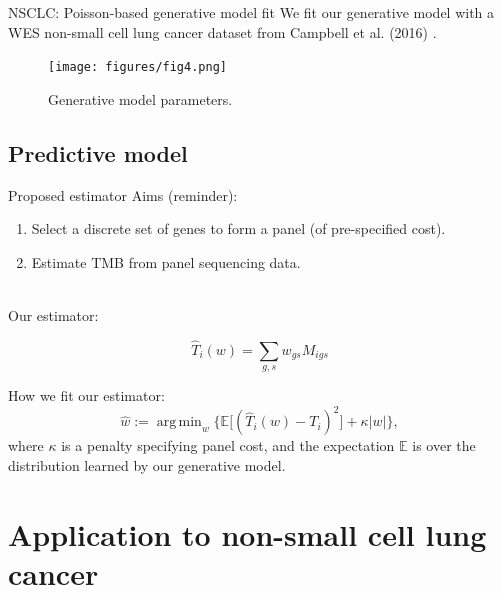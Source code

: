 \documentclass{beamer}
\DeclareMathOperator*{\argmin}{arg\,min}
\begin{document}
\begin{frame}{NSCLC: Poisson-based generative model fit}
We fit our generative model with a WES non-small cell lung cancer dataset from Campbell et al. (2016) \citep{campbell_distinct_2016}.
\begin{figure}[htbp]
\centering
\texttt{[image: figures/fig4.png]}
\caption{Generative model parameters. \citep{bradley_data-driven_2021}\label{fig:3}}
\end{figure}
\end{frame}



\subsection{Predictive model}
\begin{frame}{Proposed estimator}
Aims (reminder): 

\begin{enumerate}[1]
\item Select a discrete set of genes to form a panel (of pre-specified cost). 
\item Estimate TMB from panel sequencing data.
\end{enumerate} 
~\\
Our estimator:

\begin{equation}
    \hat{T}_i(w) = \sum_{g,s} w_{gs} M_{igs}
\end{equation}

How we fit our estimator:
\begin{equation}
    \hat{w} := \argmin_w \bigg\{ \mathbb{E}\big[(\hat{T}_i(w) - T_i)^2\big] + \kappa |w| \bigg\} ,
\end{equation}
where $\kappa$ is a penalty specifying panel cost, and the expectation $\mathbb{E}$ is over the distribution learned by our generative model.
\end{frame}



\section{Application to non-small cell lung cancer}
\end{document}
